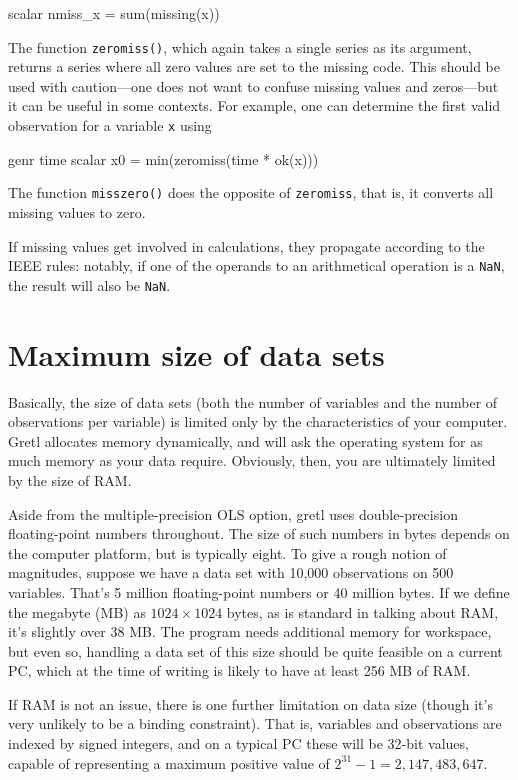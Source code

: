 \begin{code}
scalar nmiss_x = sum(missing(x))
\end{code}

The function \verb+zeromiss()+, which again takes a single series as
its argument, returns a series where all zero values are set to the
missing code.  This should be used with caution---one does not want to
confuse missing values and zeros---but it can be useful in some
contexts.  For example, one can determine the first valid observation
for a variable \verb+x+ using

\begin{code}
genr time
scalar x0 = min(zeromiss(time * ok(x)))
\end{code}

The function \verb+misszero()+ does the opposite of \verb+zeromiss+,
that is, it converts all missing values to zero.

If missing values get involved in calculations, they propagate
according to the IEEE rules: notably, if one of the operands to an
arithmetical operation is a \texttt{NaN}, the result will also be
\texttt{NaN}.
    
\section{Maximum size of data sets}
\label{data-limits}

Basically, the size of data sets (both the number of variables and the
number of observations per variable) is limited only by the
characteristics of your computer.  Gretl allocates memory
dynamically, and will ask the operating system for as much memory as
your data require.  Obviously, then, you are ultimately limited by the
size of RAM.

Aside from the multiple-precision OLS option, gretl uses
double-precision floating-point numbers throughout.  The size of such
numbers in bytes depends on the computer platform, but is typically
eight.  To give a rough notion of magnitudes, suppose we have a data
set with 10,000 observations on 500 variables.  That's 5 million
floating-point numbers or 40 million bytes.  If we define the megabyte
(MB) as $1024 \times 1024$ bytes, as is standard in talking about RAM,
it's slightly over 38 MB.  The program needs additional memory for
workspace, but even so, handling a data set of this size should be
quite feasible on a current PC, which at the time of writing is likely
to have at least 256 MB of RAM.  

If RAM is not an issue, there is one further limitation on data size
(though it's very unlikely to be a binding constraint).  That is,
variables and observations are indexed by signed integers, and on a
typical PC these will be 32-bit values, capable of representing
a maximum positive value of $2^{31} - 1 = 2,147,483,647$.

